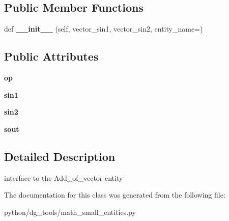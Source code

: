 \subsection*{Public Member Functions}
\begin{DoxyCompactItemize}
\item 
def {\bfseries \+\_\+\+\_\+init\+\_\+\+\_\+} (self, vector\+\_\+sin1, vector\+\_\+sin2, entity\+\_\+name=\textquotesingle{}\textquotesingle{})\hypertarget{classpython_1_1dg__tools_1_1math__small__entities_1_1Add2Vectors_aac46b1275aae7510126012c38e6ba6dc}{}\label{classpython_1_1dg__tools_1_1math__small__entities_1_1Add2Vectors_aac46b1275aae7510126012c38e6ba6dc}

\end{DoxyCompactItemize}
\subsection*{Public Attributes}
\begin{DoxyCompactItemize}
\item 
{\bfseries op}\hypertarget{classpython_1_1dg__tools_1_1math__small__entities_1_1Add2Vectors_a05f25ea034d56ca14cd8c83414d9fd6e}{}\label{classpython_1_1dg__tools_1_1math__small__entities_1_1Add2Vectors_a05f25ea034d56ca14cd8c83414d9fd6e}

\item 
{\bfseries sin1}\hypertarget{classpython_1_1dg__tools_1_1math__small__entities_1_1Add2Vectors_a83e5c3083168c62acf3d93802b396b76}{}\label{classpython_1_1dg__tools_1_1math__small__entities_1_1Add2Vectors_a83e5c3083168c62acf3d93802b396b76}

\item 
{\bfseries sin2}\hypertarget{classpython_1_1dg__tools_1_1math__small__entities_1_1Add2Vectors_a41be9171214f0243162899da628c1a6d}{}\label{classpython_1_1dg__tools_1_1math__small__entities_1_1Add2Vectors_a41be9171214f0243162899da628c1a6d}

\item 
{\bfseries sout}\hypertarget{classpython_1_1dg__tools_1_1math__small__entities_1_1Add2Vectors_ae865de9c7a4c7d2e03b8c685326e0b1f}{}\label{classpython_1_1dg__tools_1_1math__small__entities_1_1Add2Vectors_ae865de9c7a4c7d2e03b8c685326e0b1f}

\end{DoxyCompactItemize}


\subsection{Detailed Description}
interface to the Add\+\_\+of\+\_\+vector entity 

The documentation for this class was generated from the following file\+:\begin{DoxyCompactItemize}
\item 
python/dg\+\_\+tools/math\+\_\+small\+\_\+entities.\+py\end{DoxyCompactItemize}
